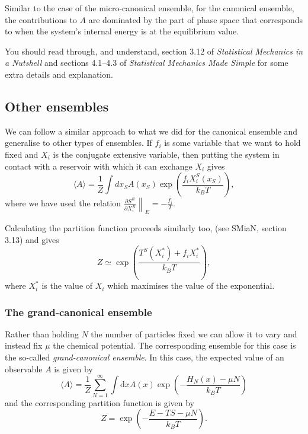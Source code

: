 Similar to the case of the micro-canonical ensemble, for the canonical ensemble, the contributions to $A$ are dominated by the part of phase space that corresponds to when the system's internal energy is at the equilibrium value. 

You should read through, and understand, section 3.12 of \emph{Statistical Mechanics in a Nutshell} and sections 4.1--4.3 of \emph{Statistical Mechanics Made Simple} for some extra details and explanation.

\subsection{Other ensembles}
We can follow a similar approach to what we did for the canonical ensemble and generalise to other types of ensembles. If $f_i$ is some variable that we want to hold fixed and $X_i$ is the conjugate extensive variable, then putting the system in contact with a reservoir with which it can exchange $X_i$ gives
\begin{equation*}
	\langle A\rangle = \frac{1}{Z}\int dx_SA(x_S)\exp\left(\frac{f_iX^S_i(x_S)}{k_BT}\right),
\end{equation*}
where we have used the relation $\left.\frac{\partial S^R}{\partial X_i^R}\right\|_E=-\frac{f_i}{T}$.

Calculating the partition function proceeds similarly too, (see SMiaN, section 3.13) and gives
\begin{equation*}
	Z \simeq \exp\left(\frac{T^S(X_i^*)+f_iX_i^*}{k_BT}\right),
\end{equation*}
where $X_i^*$ is the value of $X_i$ which maximises the value of the exponential.

\subsubsection{The grand-canonical ensemble}
Rather than holding $N$ the number of particles fixed we can allow it to vary and instead fix $\mu$ the chemical potential. The corresponding ensemble for this case is the so-called \emph{grand-canonical ensemble}. In this case, the expected value of an observable $A$ is given by
$$
	\langle A\rangle = \frac{1}{Z}\sum_{N=1}^{\infty}\int\mathrm{d}xA(x)\exp\left(-\frac{H_N(x)-\mu N}{k_B T}\right)
$$
and the corresponding partition function is given by
$$
	Z=\exp\left(-\frac{E-TS-\mu N}{k_B T}\right).
$$

